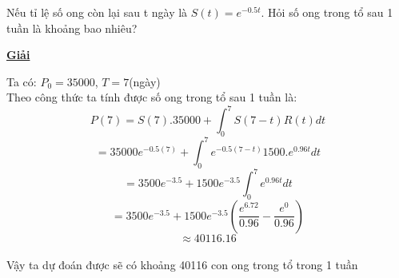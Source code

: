\documentclass[12pt,a4paper]{article}
\begin{document}
\begin{enumerate}[a/]
\begin{flushleft}
		      Nếu tỉ lệ số ong còn lại sau t ngày là $S(t) = e^{-0.5t}$.
		      Hỏi số ong trong tổ sau 1 tuần là khoảng bao nhiêu?
	      \end{flushleft}
	      \begin{center}
		      \textbf{\underline{Giải}}
	      \end{center}
	      \begin{flushleft}
		      Ta có: $P_0=35000$, $T=7$(ngày)\\
		      Theo công thức ta tính được số ong trong tổ sau 1 tuần là: %
		      $$P(7)=S(7).35000 +\int_0^7S(7-t)R(t)dt$$
		      $$=35000e^{-0.5(7)}+ \int_0^7e^{-0.5(7-t)}1500.e^{0.96t}dt$$
		      $$=3500e^{-3.5}+1500e^{-3.5}\int_0^7e^{0.96t}dt$$
		      $$=3500e^{-3.5}+1500e^{-3.5}(\frac{e^{6.72}}{0.96}-\frac{e^0}{0.96})$$
		      $$\approx40116.16$$\\
		      Vậy ta dự đoán được sẽ có khoảng 40116 con ong trong tổ trong 1 tuần
	      \end{flushleft}
\end{enumerate}

\newpage
\end{document}
